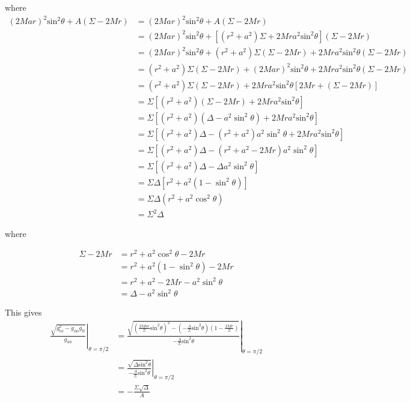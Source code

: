 \documentclass[english]{article}
\begin{document}
where 
\begin{align*}
\left(2Mar\right)^{2}\text{sin}^{2}\theta+A\left(\Sigma-2Mr\right) & =\left(2Mar\right)^{2}\text{sin}^{2}\theta+A\left(\Sigma-2Mr\right)\\
 & =\left(2Mar\right)^{2}\text{sin}^{2}\theta+\left[\left(r^{2}+a^{2}\right)\Sigma+2Mra^{2}\text{sin}^{2}\theta\right]\left(\Sigma-2Mr\right)\\
 & =\left(2Mar\right)^{2}\text{sin}^{2}\theta+\left(r^{2}+a^{2}\right)\Sigma\left(\Sigma-2Mr\right)+2Mra^{2}\text{sin}^{2}\theta\left(\Sigma-2Mr\right)\\
 & =\left(r^{2}+a^{2}\right)\Sigma\left(\Sigma-2Mr\right)+\left(2Mar\right)^{2}\text{sin}^{2}\theta+2Mra^{2}\text{sin}^{2}\theta\left(\Sigma-2Mr\right)\\
 & =\left(r^{2}+a^{2}\right)\Sigma\left(\Sigma-2Mr\right)+2Mra^{2}\text{sin}^{2}\theta\left[2Mr+\left(\Sigma-2Mr\right)\right]\\
 & =\Sigma\left[\left(r^{2}+a^{2}\right)\left(\Sigma-2Mr\right)+2Mra^{2}\text{sin}^{2}\theta\right]\\
 & =\Sigma\left[\left(r^{2}+a^{2}\right)\left(\Delta-a^{2}\sin^{2}\theta\right)+2Mra^{2}\text{sin}^{2}\theta\right]\\
 & =\Sigma\left[\left(r^{2}+a^{2}\right)\Delta-\left(r^{2}+a^{2}\right)a^{2}\sin^{2}\theta+2Mra^{2}\text{sin}^{2}\theta\right]\\
 & =\Sigma\left[\left(r^{2}+a^{2}\right)\Delta-\left(r^{2}+a^{2}-2Mr\right)a^{2}\sin^{2}\theta\right]\\
 & =\Sigma\left[\left(r^{2}+a^{2}\right)\Delta-\Delta a^{2}\sin^{2}\theta\right]\\
 & =\Sigma\Delta\left[r^{2}+a^{2}\left(1-\sin^{2}\theta\right)\right]\\
 & =\Sigma\Delta\left(r^{2}+a^{2}\cos^{2}\theta\right)\\
 & =\Sigma^{2}\Delta
\end{align*}

where

\begin{align*}
\Sigma-2Mr & =r^{2}+a^{2}\cos^{2}\theta-2Mr\\
 & =r^{2}+a^{2}\left(1-\sin^{2}\theta\right)-2Mr\\
 & =r^{2}+a^{2}-2Mr-a^{2}\sin^{2}\theta\\
 & =\Delta-a^{2}\sin^{2}\theta
\end{align*}

This gives 
\begin{align*}
\left.\frac{\sqrt{g^{2}_{t\phi}-g_{\phi\phi}g_{tt}}}{g_{\phi\phi}}\right|_{\theta=\pi/2} & =\left.\frac{\sqrt{\left(\frac{2Mar}{\Sigma}\text{sin}^{2}\theta\right)^{2}-\left(-\frac{A}{\Sigma}\text{sin}^{2}\theta\right)\left(1-\frac{2Mr}{\Sigma}\right)}}{-\frac{A}{\Sigma}\text{sin}^{2}\theta}\right|_{\theta=\pi/2}\\
 & =\left.\frac{\sqrt{\Delta\text{sin}^{2}\theta}}{-\frac{A}{\Sigma}\text{sin}^{2}\theta}\right|_{\theta=\pi/2}\\
 & =-\frac{\Sigma\sqrt{\Delta}}{A}
\end{align*}
\end{document}
